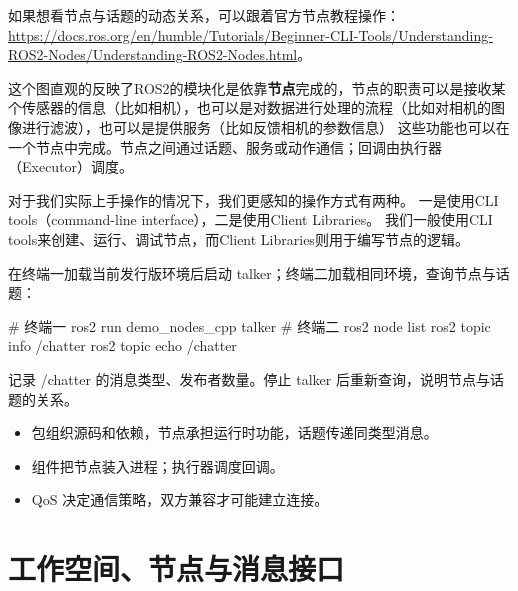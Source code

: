 \begin{note}
如果想看节点与话题的动态关系，可以跟着官方节点教程操作：\url{https://docs.ros.org/en/humble/Tutorials/Beginner-CLI-Tools/Understanding-ROS2-Nodes/Understanding-ROS2-Nodes.html}。
\end{note}


这个图直观的反映了ROS2的模块化是依靠\textbf{节点}完成的，节点的职责可以是接收某个传感器的信息（比如相机），也可以是对数据进行处理的流程（比如对相机的图像进行滤波），也可以是提供服务（比如反馈相机的参数信息）
这些功能也可以在一个节点中完成。节点之间通过话题、服务或动作通信；回调由执行器（Executor）调度。


对于我们实际上手操作的情况下，我们更感知的操作方式有两种。
一是使用CLI tools（command-line interface），二是使用Client Libraries。
我们一般使用CLI tools来创建、运行、调试节点，而Client Libraries则用于编写节点的逻辑。

\begin{example}
在终端一加载当前发行版环境后启动 talker；终端二加载相同环境，查询节点与话题：
\par\medskip\noindent\begin{minipage}{\linewidth}
\begin{tbash}
# 终端一
ros2 run demo_nodes_cpp talker
# 终端二
ros2 node list
ros2 topic info /chatter
ros2 topic echo /chatter
\end{tbash}
\end{minipage}\par\smallskip
\end{example}

\begin{exercise}
\label{ex:v2-ros-graph}
记录 /chatter 的消息类型、发布者数量。停止 talker 后重新查询，说明节点与话题的关系。
\end{exercise}

\begin{conclusion}
\begin{itemize}
\item 包组织源码和依赖，节点承担运行时功能，话题传递同类型消息。
\item 组件把节点装入进程；执行器调度回调。
\item QoS 决定通信策略，双方兼容才可能建立连接。
\end{itemize}
\end{conclusion}

\section{工作空间、节点与消息接口}
